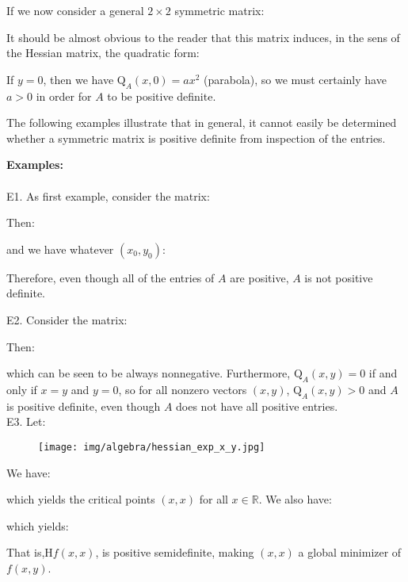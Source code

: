 	If we now consider a general $2\times 2$ symmetric matrix:
	
	It should be almost obvious to the reader that this matrix induces, in the sens of the Hessian matrix, the quadratic form:
	
	If $y = 0$, then we have $\mathrm{Q}_A(x,0) = ax^2$ (parabola), so we must certainly have $a > 0$ in order for $A$ to be positive definite.
	
	The following examples illustrate that in general, it cannot easily be determined whether a symmetric matrix is positive definite from inspection of the entries.
	\begin{tcolorbox}[colframe=black,colback=white,sharp corners]
	\textbf{{\Large {}}Examples:}\\\\
	E1. As first example, consider the matrix:
	
	Then:
	
	and we have whatever $(x_0,y_0)$:
	
	Therefore, even though all of the entries of $A$ are positive, $A$ is not positive definite.
	\end{tcolorbox}
	\begin{tcolorbox}[colframe=black,colback=white,sharp corners]
	E2. Consider the matrix:
	
	Then:
	
	which can be seen to be always nonnegative. Furthermore, $ \mathrm{Q}_A(x,y) =0 $ if and only if $x = y$ and $y =0$, so for all nonzero vectors $(x,y)$, $ \mathrm{Q}_A(x,y) >0 $ and $A$ is positive definite, even though $A$ does not have all positive entries.\\
	
	E3. Let:
	
	\begin{figure}[H]
		\centering
		\texttt{[image: img/algebra/hessian\_exp\_x\_y.jpg]}
	\end{figure}
	We have:
	
	which yields the critical points $(x, x)$ for all $x \in \mathds{R}$. We also have:
	
	which yields:
	
	That is,$\mathrm{H}f(x,x)$, is positive semidefinite, making $(x,x)$ a global minimizer of $f(x,y)$.
	\end{tcolorbox}
	
